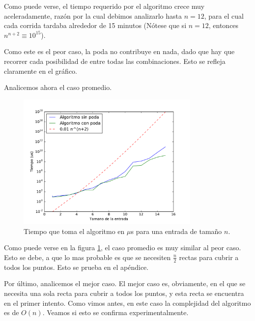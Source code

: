 Como puede verse, el tiempo requerido por el algoritmo crece muy aceleradamente, razón por la cual debimos analizarlo hasta $n = 12$, para el cual cada corrida tardaba alrededor de 15 minutos (Nótese que si $n = 12$, entonces $n^{n+2} \equiv 10^15$).

Como este es el peor caso, la poda no contribuye en nada, dado que hay que recorrer cada posibilidad de entre todas las combinaciones. Esto se refleja claramente en el gráfico.

Analicemos ahora el caso promedio.

\begin{figure}[H]
 \centering
	\includegraphics[width=0.8\textwidth]{img/tiempos/kamehameha2.pdf}
	\caption{\footnotesize Tiempo que toma el algoritmo en $\mu$s para una entrada de tamaño $n$.}
	\label{fig:kamehameha-tiempos2}
\end{figure}

Como puede verse en la figura \ref{fig:kamehameha-tiempos2}, el caso promedio es muy similar al peor caso. Esto se debe, a que lo mas probable es que se necesiten $\frac{n}{2}$ rectas para cubrir a todos los puntos. Esto se prueba en el ap\'endice.

Por último, analicemos el mejor caso. El mejor caso es, obviamente, en el que se necesita una sola recta para cubrir a todos los puntos, y esta recta se encuentra en el primer intento. Como vimos antes, en este caso la complejidad del algoritmo es de $O(n)$. Veamos si esto se confirma experimentalmente.

